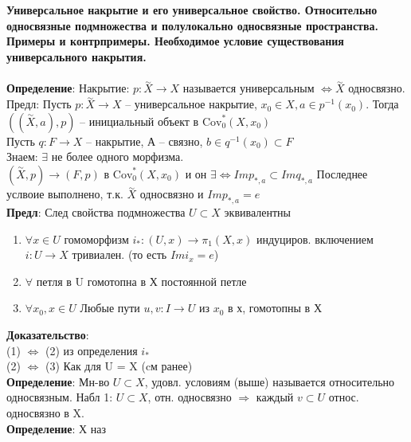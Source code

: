 	\section{}
	\textbf{Универсальное накрытие и его универсальное свойство. Относительно односвязные подмножества и полулокально односвязные пространства. Примеры и контрпримеры. Необходимое условие существования универсального накрытия.}\\
	\\	
	\textbf{Определение}: Накрытие: $p: \overset{\sim}{X} \rightarrow X$ называется универсальным $\Leftrightarrow \overset{\sim}{X}$ односвязно.\\
	Предл: Пусть $p: \overset{\sim}{X} \rightarrow X$ -- универсальное накрытие, $x_0 \in X, a\in p^{-1}(x_0)$. Тогда $((\overset{\sim}{X}, a), p)$ -- инициальный объект в $\text{Cov}_{0}^{*}(X,x_0)$\\
	Пусть $q: F\rightarrow X$ -- накрытие, А -- связно, $b\in q^{-1}(x_0) \subset F$\\
	Знаем: $\exists$ не более одного морфизма.\\
	$(\overset{\sim}{X}, p) \rightarrow (F,p)$ в $\text{Cov}_{0}^{*}(X,x_0)$ и он $\exists \Leftrightarrow Im p_{*,a} \subset Im q_{*,a}$ Последнее услвоие выполнено, т.к. $\overset{\sim}{X}$ односвязно и $Im p_{*,a} = {e}$\\
	\textbf{Предл}: След свойства подмножества $U\subset X$ эквивалентны\\
	\begin{enumerate}
		\item $\forall x \in U$ гомоморфизм $i_{*}: (U,x)\rightarrow \pi_1(X,x)$ индуциров. включением $i: U\rightarrow X$ тривиален. (то есть $Im i_x = {e}$)
		\item $\forall$ петля в U гомотопна в Х постоянной петле
		\item $\forall x_0, x \in U$ Любые пути $u,v: I\rightarrow U$ из $x_0$ в х, гомотопны в Х
	\end{enumerate}
	\textbf{Доказательство}:\\
	(1) $\Leftrightarrow$ (2) из определения $i_{*}$\\
	(2) $\Leftrightarrow$ (3) Как для U = X (cм ранее)\\
	\textbf{Определение}: Мн-во $U \subset X$, удовл. условиям (выше) называется относительно односвязным.
	Набл 1: $U \subset X$, отн. односвязно $\Rightarrow$ каждый $v \subset U $ относ. односвязно в X.\\
	\textbf{Определение}: Х наз\\
